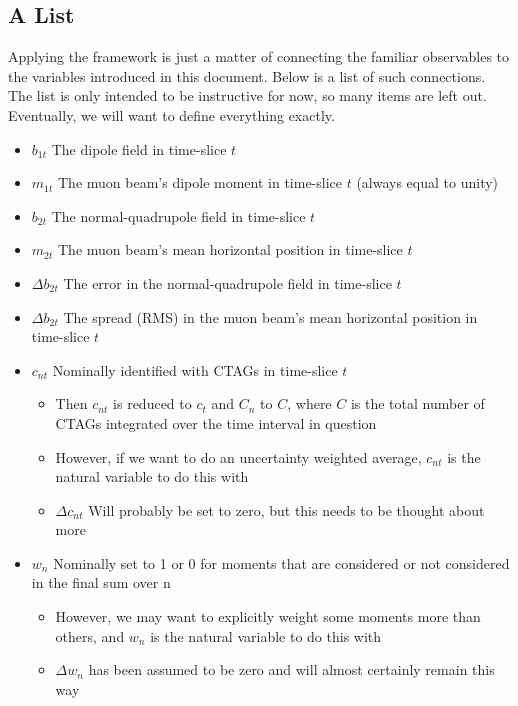 \documentclass[twoside]{article}
\begin{document}
\subsection{A List}
Applying the framework is just a matter of connecting the familiar observables to the variables introduced in this document. Below is a list of such connections. The list is only intended to be instructive for now, so many items are left out. Eventually, we will want to define everything exactly.
\begin{itemize}
	\item $b_{1t}$  The dipole field in time-slice $t$
	\item $m_{1t}$ The muon beam's dipole moment in time-slice $t$ (always equal to unity)
	\item $b_{2t}$ The normal-quadrupole  field in time-slice $t$
	\item $m_{2t}$ The muon beam's mean horizontal position in time-slice $t$
	 \item $\Delta b_{2t}$ The error in the normal-quadrupole  field in time-slice $t$
	 \item $\Delta b_{2t}$ The spread (RMS) in the muon beam's mean horizontal position in time-slice $t$	
	 \item $c_{nt}$ Nominally identified with CTAGs in time-slice $t$
	 \begin{itemize}
	 	 \item Then $c_{nt}$  is reduced to $c_{t}$ and $C_{n}$ to $C$, where $C$ is the total number of CTAGs integrated over the time interval in question 
	 	 \item However, if we want to do an uncertainty weighted average, $c_{nt}$ is the natural variable to do this with
	 	 \item  $\Delta c_{nt}$ Will probably be set to zero, but this needs to be thought about more
	 \end{itemize}
	 \item  $w_{n}$ Nominally set to 1 or 0 for moments that are considered or not considered in the final sum over n
	 \begin{itemize}
	 	 \item However, we may want to explicitly weight some moments more than others, and $w_{n}$ is the natural variable to do this with
	 	 \item  $\Delta w_{n}$ has been assumed to be zero and will almost certainly remain this way
	 \end{itemize}
	
\end{itemize}
\end{document}

